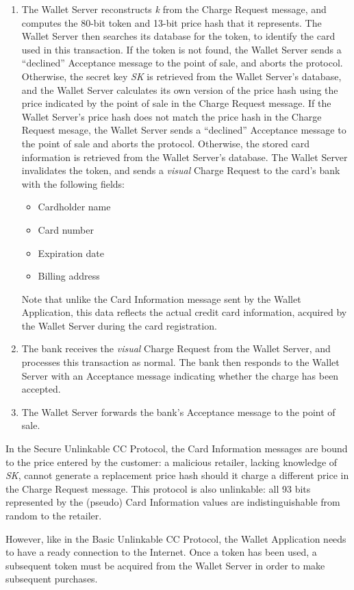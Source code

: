 \begin{enumerate}
\item The Wallet Server reconstructs \emph{k} from the Charge Request message, and computes the 80-bit token and 13-bit price hash that it represents.
    The Wallet Server then searches its database for the token, to identify the card used in this transaction.
    If the token is not found, the Wallet Server sends a ``declined'' Acceptance message to the point of sale, and aborts the protocol.
    Otherwise, the secret key \emph{SK} is retrieved from the Wallet Server's database, and the Wallet Server calculates its own version of the price hash
        using the price indicated by the point of sale in the Charge Request message.
    If the Wallet Server's price hash does not match the price hash in the Charge Request mesage,
        the Wallet Server sends a ``declined'' Acceptance message to the point of sale and aborts the protocol.
    Otherwise, the stored card information is retrieved from the Wallet Server's database.
    The Wallet Server invalidates the token, and sends a \emph{visual} Charge Request to the card's bank with the following fields:
    \begin{itemize}
    \item Cardholder name
    \item Card number
    \item Expiration date
    \item Billing address
    \end{itemize}
    Note that unlike the Card Information message sent by the Wallet Application, this data reflects the actual credit card information,
        acquired by the Wallet Server during the card registration.

\item The bank receives the \emph{visual} Charge Request from the Wallet Server, and processes this transaction as normal.
    The bank then responds to the Wallet Server with an Acceptance message indicating whether the charge has been accepted.

\item The Wallet Server forwards the bank's Acceptance message to the point of sale.
\end{enumerate}

In the Secure Unlinkable CC Protocol, the Card Information messages are bound to the price entered by the customer:
    a malicious retailer, lacking knowledge of \emph{SK}, cannot generate a replacement price hash should it charge a different price in the Charge Request message.
This protocol is also unlinkable: all 93 bits represented by the (pseudo) Card Information values are indistinguishable from random to the retailer.

However, like in the Basic Unlinkable CC Protocol, the Wallet Application needs to have a ready connection to the Internet.
Once a token has been used, a subsequent token must be acquired from the Wallet Server in order to make subsequent purchases.